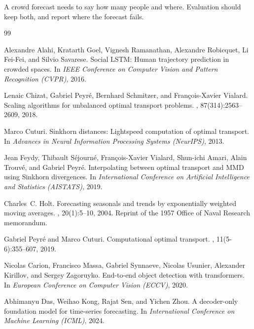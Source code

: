 \documentclass{article}
\begin{document}
A crowd forecast needs to say how many people and where. Evaluation should keep both, and report where the forecast fails.




{\small
\begin{thebibliography}{99}

Alexandre Alahi, Kratarth Goel, Vignesh Ramanathan, Alexandre Robicquet,
  Li Fei-Fei, and Silvio Savarese.
\newblock Social {LSTM}: Human trajectory prediction in crowded spaces.
\newblock In {\em IEEE Conference on Computer Vision and Pattern Recognition
  (CVPR)}, 2016.

Lenaic Chizat, Gabriel Peyr\'e, Bernhard Schmitzer, and Fran\c{c}ois-Xavier
  Vialard.
\newblock Scaling algorithms for unbalanced optimal transport problems.
, 87(314):2563--2609, 2018.

Marco Cuturi.
\newblock Sinkhorn distances: Lightspeed computation of optimal transport.
\newblock In {\em Advances in Neural Information Processing Systems (NeurIPS)},
  2013.

Jean Feydy, Thibault S\'ejourn\'e, Fran\c{c}ois-Xavier Vialard, Shun-ichi
  Amari, Alain Trouv\'e, and Gabriel Peyr\'e.
\newblock Interpolating between optimal transport and {MMD} using {S}inkhorn
  divergences.
\newblock In {\em International Conference on Artificial Intelligence and
  Statistics (AISTATS)}, 2019.

Charles~C. Holt.
\newblock Forecasting seasonals and trends by exponentially weighted moving
  averages.
, 20(1):5--10, 2004.
\newblock Reprint of the 1957 Office of Naval Research memorandum.

Gabriel Peyr\'e and Marco Cuturi.
\newblock Computational optimal transport.
, 11(5-6):355--607,
  2019.

Nicolas Carion, Francisco Massa, Gabriel Synnaeve, Nicolas Usunier,
  Alexander Kirillov, and Sergey Zagoruyko.
\newblock End-to-end object detection with transformers.
\newblock In {\em European Conference on Computer Vision (ECCV)}, 2020.

Abhimanyu Das, Weihao Kong, Rajat Sen, and Yichen Zhou.
\newblock A decoder-only foundation model for time-series forecasting.
\newblock In {\em International Conference on Machine Learning (ICML)}, 2024.


\end{thebibliography}}
\end{document}
